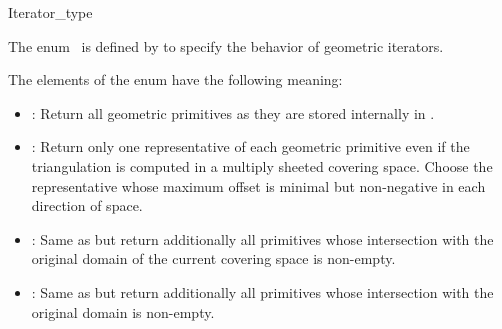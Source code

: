 
\ccModifierCrossRefOff
\begin{ccRefEnum}{Iterator_type}

\ccDefinition
  
The enum \ccRefName\ is defined by  to
specify the behavior of geometric iterators.

{}

The elements of the enum have the following meaning:
\begin{itemize}
%
\item{:} Return all geometric primitives as they are
  stored internally in .
%
\item{:} Return only one representative of each geometric
  primitive even if the triangulation is computed in a multiply
  sheeted covering space. Choose the representative whose maximum
  offset is minimal but non-negative in each direction of space.
%
\item{:} Same as  but return
  additionally all primitives whose intersection with the original
  domain of the current covering space is non-empty.
%
\item{:} Same as  but return
  additionally all primitives whose intersection with the original
  domain is non-empty.
%
\end{itemize}

\ccSeeAlso


\end{ccRefEnum}
\ccModifierCrossRefOn
